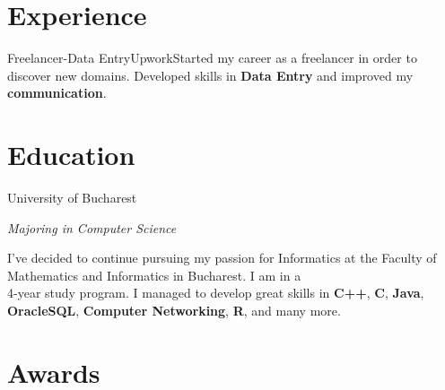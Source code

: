 \documentclass[letterpaper]{twentysecondcv} %
\begin{document}
\section{Experience}

\begin{twenty}
	 {\large Freelancer-Data Entry}{Upwork}{Started my career as a freelancer in order to discover new domains. Developed skills in \textbf{Data Entry} and improved my \textbf{communication}.}
\end{twenty}
\section{Education}

\begin{twenty}
	 {University of Bucharest}{\emph{Majoring in Computer Science}
	\vspace{1.5mm}
	
	{I've decided to continue pursuing my passion for Informatics at the Faculty of Mathematics and Informatics in Bucharest. I am in a \\    4-year study program. I managed to develop great skills in \textbf{C++}, \textbf{C}, \textbf{Java}, \textbf{OracleSQL}, \textbf{Computer Networking}, \textbf{R}, and many more.}}
\end{twenty}
\section{Awards}
\end{document}
